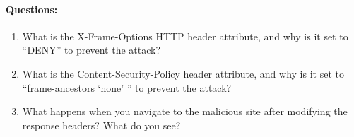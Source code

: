 \paragraph{Questions:}
\begin{enumerate}
    \item What is the X-Frame-Options HTTP header attribute, and why is
    it set to ``DENY'' to prevent the attack?
    \item What is the Content-Security-Policy header attribute, and why
    is it set to ``frame-ancestors `none' '' to prevent the attack?
    \item What happens when you navigate to the malicious site
    after modifying the response headers? What do you see?

\end{enumerate}

